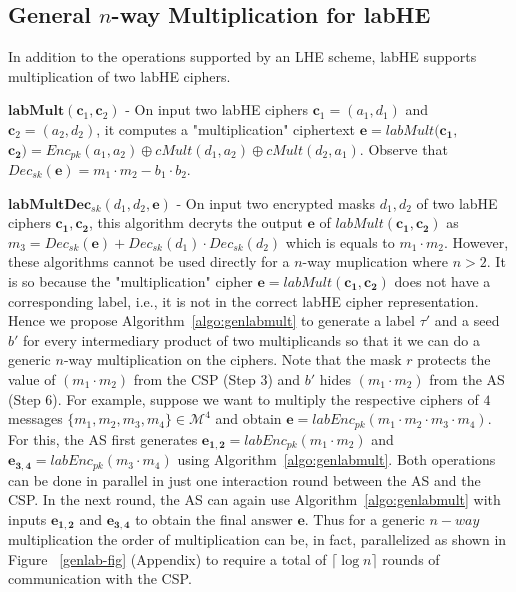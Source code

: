 \subsection{\textbf{General $n$-way Multiplication for \textsf{labHE}}}\label{genlab}
In addition to the operations supported by an \textsf{LHE}  scheme, \textsf{labHE} supports multiplication of two \textsf{labHE} ciphers. 
\squishlist
\item $\textbf{labMult}(\mathbf{c}_1,\mathbf{c}_2)$ - On input two \textsf{labHE} ciphers $\mathbf{c}_1=(a_1,d_1)$ and $\mathbf{c}_2=(a_2,d_2)$, it computes a "multiplication" ciphertext  $\mathbf{e}=labMult(\mathbf{c_1,}$ $\mathbf{c_2})=Enc_{pk}(a_1,a_2)\oplus cMult(d_1,a_2) \oplus cMult(d_2,a_1)$. Observe that $Dec_{sk}(\mathbf{e})=m_1\cdot m_2 -b_1 \cdot b_2$.
\item $\textbf{labMultDec}_{sk}(d_1,d_2,\mathbf{e})$ - On input two encrypted masks $d_1,d_2$ of two \textsf{labHE} ciphers $\mathbf{c_1},\mathbf{c_2}$, this algorithm decryts the output $\mathbf{e}$ of $labMult(\mathbf{c_1},\mathbf{c_2})$ as $m_3=Dec_{sk}(\mathbf{e})+Dec_{sk}(d_1)\cdot Dec_{sk}(d_2)$ which is equals to $m_1\cdot m_2$.   
\squishend
However, these algorithms cannot be used directly for a $n$-way muplication where $n>2$.  It is so because the "multiplication" cipher $\mathbf{e}=labMult(\mathbf{c_1},\mathbf{c_2})$ does not have  a corresponding label, i.e., it is not in the correct \textsf{labHE} cipher representation. Hence we propose Algorithm~\ref{algo:genlabmult} to generate a label $\tau'$ and a seed $b'$ for every intermediary product of two multiplicands so that it we can do a generic $n$-way multiplication on the ciphers. Note that the mask $r$ protects the value of $(m_1\cdot m_2)$ from the \textsf{CSP} (Step 3) and $b'$ hides $(m_1\cdot m_2)$ from the \textsf{AS} (Step 6). 
For example, suppose we want to multiply the respective ciphers of  $4$ messages $\{m_1,m_2,m_3,m_4\} \in \mathcal{M}^4$ and obtain $\mathbf{e}=labEnc_{pk}(m_1\cdot m_2\cdot m_3 \cdot m_4)$. For this, the \textsf{AS} first generates $\mathbf{e_{1,2}}=labEnc_{pk}(m_1\cdot m_2)$ and $\mathbf{e_{3,4}}=labEnc_{pk}(m_3\cdot m_4)$ using Algorithm~\ref{algo:genlabmult}. Both operations can be done in parallel in just one interaction round between the \textsf{AS} and the \textsf{CSP}. In the next round,  the \textsf{AS} can again use Algorithm~\ref{algo:genlabmult} with inputs $\mathbf{e_{1,2}}$ and $\mathbf{e_{3,4}}$ to obtain the final answer $\mathbf{e}$. %
Thus for a generic $n-way$ multiplication the order of multiplication can be, in fact, parallelized as  shown in Figure ~\ref{genlab-fig} (Appendix) to require a total of $\lceil \log n\rceil$ rounds of communication with the \textsf{CSP}.

